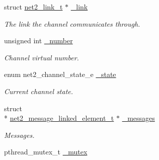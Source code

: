 \begin{DoxyCompactItemize}
\item 
\hypertarget{structnet2__channel__input__t_a5794895a5c4de0ea1d6cab39b4838683}{struct \hyperlink{structnet2__link__t}{net2\-\_\-link\-\_\-t} $\ast$ \hyperlink{structnet2__channel__input__t_a5794895a5c4de0ea1d6cab39b4838683}{\-\_\-link}}\label{structnet2__channel__input__t_a5794895a5c4de0ea1d6cab39b4838683}

\begin{DoxyCompactList}\small\item\em The link the channel communicates through. \end{DoxyCompactList}\item 
\hypertarget{structnet2__channel__input__t_aad432fed1cbfe759ef2d473ab8f47109}{unsigned int \hyperlink{structnet2__channel__input__t_aad432fed1cbfe759ef2d473ab8f47109}{\-\_\-number}}\label{structnet2__channel__input__t_aad432fed1cbfe759ef2d473ab8f47109}

\begin{DoxyCompactList}\small\item\em Channel virtual number. \end{DoxyCompactList}\item 
\hypertarget{structnet2__channel__input__t_a3363f7063e071be71e1320617a870b84}{enum net2\-\_\-channel\-\_\-state\-\_\-e \hyperlink{structnet2__channel__input__t_a3363f7063e071be71e1320617a870b84}{\-\_\-state}}\label{structnet2__channel__input__t_a3363f7063e071be71e1320617a870b84}

\begin{DoxyCompactList}\small\item\em Current channel state. \end{DoxyCompactList}\item 
\hypertarget{structnet2__channel__input__t_a62adebf1311e1002e0f5a67fa00ea1a0}{struct \\*
\hyperlink{structnet2__message__linked__element__t}{net2\-\_\-message\-\_\-linked\-\_\-element\-\_\-t} $\ast$ \hyperlink{structnet2__channel__input__t_a62adebf1311e1002e0f5a67fa00ea1a0}{\-\_\-messages}}\label{structnet2__channel__input__t_a62adebf1311e1002e0f5a67fa00ea1a0}

\begin{DoxyCompactList}\small\item\em Messages. \end{DoxyCompactList}\item 
\hypertarget{structnet2__channel__input__t_a9d656c00ee2f6d89286272487bac4ec3}{pthread\-\_\-mutex\-\_\-t \hyperlink{structnet2__channel__input__t_a9d656c00ee2f6d89286272487bac4ec3}{\-\_\-mutex}}\label{structnet2__channel__input__t_a9d656c00ee2f6d89286272487bac4ec3}


\end{DoxyCompactItemize}
